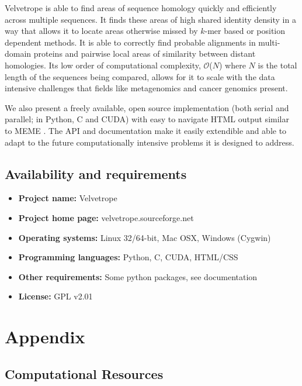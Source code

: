 \documentclass[phd,tocprelim]{cornell}
\begin{document}
Velvetrope is able to find areas of sequence homology quickly and efficiently across multiple sequences. It finds these areas of high shared identity density in a way that allows it to locate areas otherwise missed by $k$-mer based or position dependent methods. It is able to correctly find probable alignments in multi-domain proteins and pairwise local areas of similarity between distant homologies. Its low order of computational complexity, $\mathcal O$($N$) where $N$ is the total length of the sequences
being compared, allows for it to scale with the data intensive challenges that fields like metagenomics and cancer genomics present.

We also present a freely available, open source implementation (both serial and parallel; in Python, C and CUDA) with easy to navigate HTML output similar to MEME \cite{MEME}. The API and documentation make it easily extendible and able to adapt to the future computationally intensive problems it is designed to address.

\section{Availability and requirements}
 \begin{itemize}
  \item \textbf{Project name:} Velvetrope
  \item \textbf{Project home page:} velvetrope.sourceforge.net
  \item \textbf{Operating systems:} Linux 32/64-bit, Mac OSX, Windows (Cygwin)
  \item \textbf{Programming languages:} Python, C, CUDA, HTML/CSS
  \item \textbf{Other requirements:} Some python packages, see documentation
  \item \textbf{License:} GPL v2.01
 \end{itemize}



\appendix
\chapter{Appendix}

\section{Computational Resources}
\end{document}
